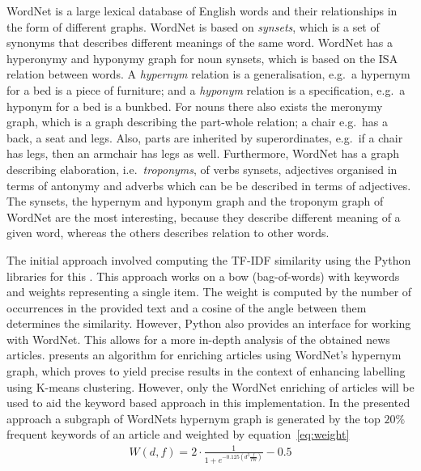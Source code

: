 WordNet is a large lexical database of English words and their relationships in the form of different graphs. WordNet is based on \emph{synsets}, which is a set of synonyms that describes different meanings of the same word. WordNet has a hyperonymy and hyponymy graph for noun synsets, which is based on the ISA relation between words. A \emph{hypernym} relation is a generalisation, e.g.\ a hypernym for a bed is a piece of furniture; and a \emph{hyponym} relation is a specification, e.g.\ a hyponym for a bed is a bunkbed. For nouns there also exists the meronymy graph, which is a graph describing the part-whole relation; a chair e.g.\ has a back, a seat and legs. Also, parts are inherited by superordinates, e.g.\ if a chair has legs, then an armchair has legs as well. Furthermore, WordNet has a graph describing elaboration, i.e.\ \emph{troponyms}, of verbs synsets, adjectives organised in terms of antonymy and adverbs which can be be described in terms of adjectives. The synsets, the hypernym and hyponym graph and the troponym graph of WordNet are the most interesting, because they describe different meaning of a given word, whereas the others describes relation to other words.

The initial approach involved computing the TF-IDF similarity using the Python libraries for this \cite{NLTK}. This approach works on a bow (bag-of-words) with keywords and weights representing a single item. The weight is computed by the number of occurrences in the provided text and a cosine of the angle between them determines the similarity. However, Python also provides an interface for working with WordNet. This allows for a more in-depth analysis of the obtained news articles. \cite{116262780379.pdf} presents an algorithm for enriching articles using WordNet's hypernym graph, which proves to yield precise results in the context of enhancing labelling using K-means clustering. However, only the WordNet enriching of articles will be used to aid the keyword based approach in this implementation. In the presented approach a subgraph of WordNets hypernym graph is generated by the top $20\%$ frequent keywords of an article and weighted by equation~\ref{eq:weight}
\begin{align}
W(d, f) = 2 \cdot \frac{1}{1+e^{-0.125(d^3\frac{f}{TW})}}-0.5
\label{eq:weight}
\end{align}

